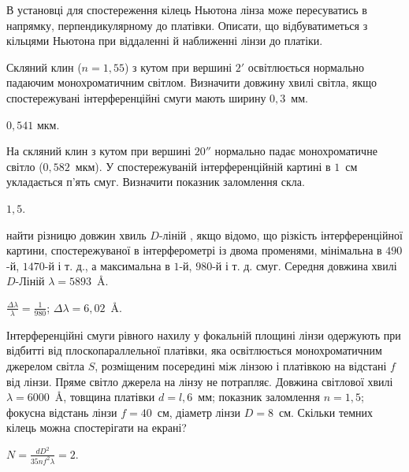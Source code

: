 \begin{problem}%
В установці для спостереження кілець Ньютона лінза може
пересуватись в напрямку, перпендикулярному до платівки. Описати,
що відбуватиметься з кільцями Ньютона при віддаленні й наближенні
лінзи до платіки.
\end{problem}


\begin{problem}%
Скляний клин ($ n = 1,55 $) з кутом при вершині $ 2' $ освітлюється
нормально падаючим монохроматичним світлом. Визначити довжину
хвилі світла, якщо спостережувані інтерференційні смуги мають
ширину $ 0,3 $~мм.
\begin{solution}
	$ 0,541 $ мкм.
\end{solution}
\end{problem}


\begin{problem}%
На скляний клин з кутом при вершині $ 20'' $ нормально падає
монохроматичне світло ($ 0,582 $~мкм). У спостережуваній
інтерференційній картині в $ 1 $~см укладається п'ять смуг. Визначити
показник заломлення скла.
\begin{solution}
	$ 1,5 $.
\end{solution}
\end{problem}


\begin{problem}%
найти різницю довжин хвиль $D$-ліній , якщо відомо, що різкість
інтерференційної картини, спостережуваної в інтерферометрі із двома
променями, мінімальна в $ 490 $-й, $ 1470 $-й і т. д., а максимальна в $ 1 $-й, $ 980 $-й
і т. д. смуг. Середня довжина хвилі $D$-Ліній $ \lambda = 5893$~\AA.
\begin{solution}
	$\frac{\Delta\lambda}{\lambda} = \frac1{980}$; $\Delta\lambda = 6,02$~\AA.
\end{solution}
\end{problem}



\begin{problem}%
Інтерференційні смуги рівного нахилу у фокальній площині лінзи
одержують при відбитті від плоскопараллельної платівки, яка
освітлюється монохроматичним джерелом світла $S$, розміщеним
посередині між лінзою і платівкою на відстані $f$ від лінзи. Пряме
світло джерела на лінзу не потрапляє. Довжина світлової хвилі $ \lambda = 6000 $~\AA,
товщина платівки $ d = l,6 $~мм; показник заломлення $ n = 1,5 $; фокусна
відстань лінзи $ f = 40 $~см, діаметр лінзи $ D = 8 $~см. Скільки темних кілець
можна спостерігати на екрані?
\begin{solution}
	$N = \frac{dD^2}{35nf^2\lambda} = 2$.
\end{solution}
\end{problem}



